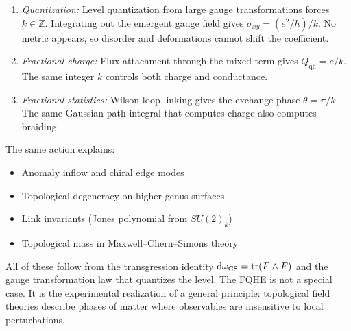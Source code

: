 \begin{enumerate}
  \item \emph{Quantization:} Level quantization from large gauge transformations forces $k\in\mathbb Z$. Integrating out the emergent gauge field gives $\sigma_{xy}=(e^2/h)/k$. No metric appears, so disorder and deformations cannot shift the coefficient.

  \item \emph{Fractional charge:} Flux attachment through the mixed term gives $Q_{\mathrm{qh}}=e/k$. The same integer $k$ controls both charge and conductance.

  \item \emph{Fractional statistics:} Wilson-loop linking gives the exchange phase $\theta=\pi/k$. The same Gaussian path integral that computes charge also computes braiding.
\end{enumerate}

The same action explains:
\begin{itemize}
  \item Anomaly inflow and chiral edge modes
  \item Topological degeneracy on higher-genus surfaces
  \item Link invariants (Jones polynomial from $SU(2)_k$)
  \item Topological mass in Maxwell--Chern--Simons theory
\end{itemize}

All of these follow from the transgression identity $\mathrm{d}\omega_{\operatorname{CS}}=\operatorname{tr}(F\wedge F)$ and the gauge transformation law that quantizes the level. The FQHE is not a special case. It is the experimental realization of a general principle: topological field theories describe phases of matter where observables are insensitive to local perturbations.

